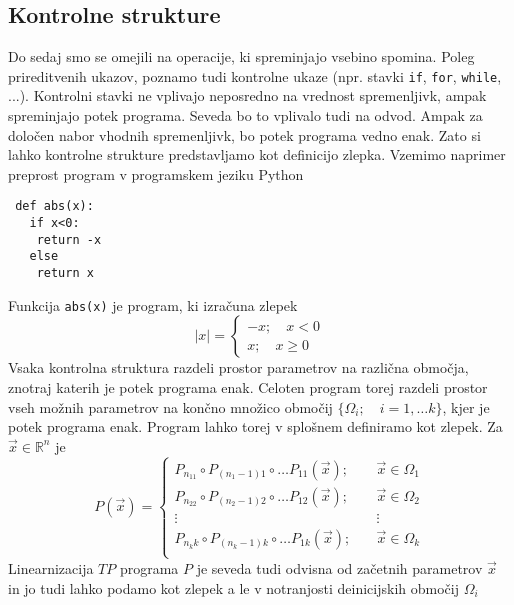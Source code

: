 \documentclass{article}
\newcommand{\RR}{\mathbb{R}}
\begin{document}
 
 
 \subsection{Kontrolne strukture}
 
 Do sedaj smo se omejili na operacije, ki spreminjajo vsebino spomina. Poleg
 prireditvenih ukazov, poznamo tudi kontrolne ukaze (npr. stavki \texttt{if},
 \texttt{for}, \texttt{while}, ...). Kontrolni stavki ne vplivajo neposredno na
 vrednost spremenljivk, ampak spreminjajo potek programa. Seveda bo to vplivalo
 tudi na odvod. Ampak za določen nabor vhodnih spremenljivk, bo potek programa
 vedno enak. Zato si lahko kontrolne strukture predstavljamo kot definicijo
 zlepka. Vzemimo naprimer preprost program v programskem jeziku Python
 \begin{verbatim}
 def abs(x):
   if x<0:
    return -x
   else
    return x
 \end{verbatim}
 Funkcija \texttt{abs(x)} je program, ki izračuna zlepek
 \begin{equation}
   \label{eq:zlepek}
   |x| =
   \begin{cases}
     -x;\quad x<0\\
     x;\quad x\ge 0
   \end{cases}
 \end{equation}
 Vsaka kontrolna struktura razdeli prostor parametrov na različna območja,
 znotraj katerih je potek programa enak. Celoten program torej razdeli prostor
 vseh možnih parametrov na končno množico območij $\{\Omega_i;\quad i=1,\ldots
 k\}$, kjer je potek programa enak. Program lahko torej v splošnem definiramo kot
 zlepek. Za $\vec{x}\in\RR^n$ je
 \begin{equation}
   \label{eq:zlrprk_splosno}
   P(\vec{x}) =
   \begin{cases}
     P_{n_11}\circ P_{(n_1-1)1}\circ\ldots P_{11}(\vec{x});&\quad \vec{x}\in\Omega_1\\
     P_{n_22}\circ P_{(n_2-1)2}\circ\ldots P_{12}(\vec{x});&\quad \vec{x}\in\Omega_2\\
     \vdots&\quad\vdots\\
     P_{n_kk}\circ P_{(n_k-1)k}\circ\ldots P_{1k}(\vec{x});&\quad \vec{x}\in\Omega_k\\
   \end{cases}
 \end{equation}
 Linearnizacija $TP$ programa $P$ je seveda tudi odvisna od začetnih parametrov
 $\vec{x}$ in jo tudi lahko podamo kot zlepek a le v notranjosti deinicijskih območij $\Omega_i$
\end{document}

